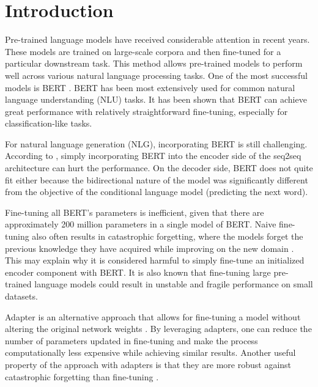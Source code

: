\chapter*{Introduction}
Pre-trained language models  have received considerable attention in recent years. These models are trained on large-scale corpora and then fine-tuned for a particular downstream task. This method allows pre-trained models to perform well across various natural language processing tasks. One of the most successful models is BERT . BERT has been most extensively used for common natural language understanding (NLU) tasks. It has been shown that BERT can achieve great performance with relatively straightforward fine-tuning, especially for classification-like tasks.

For natural language generation (NLG), incorporating BERT is still challenging. According to , simply incorporating BERT into the encoder side of the seq2seq architecture can hurt the performance. On the decoder side, BERT does not quite fit either because the bidirectional nature of the model was significantly different from the objective of the conditional language model (predicting the next word).

Fine-tuning all BERT's parameters is inefficient, given that there are approximately 200 million parameters in a single model of BERT. Naive fine-tuning also often results in catastrophic forgetting, where the models forget the previous knowledge they have acquired while improving on the new domain . This may explain why it is considered harmful to simply fine-tune an initialized encoder component with BERT. It is also known that fine-tuning large pre-trained language models could result in unstable and fragile performance on small datasets.

Adapter is an alternative approach that allows for fine-tuning a model without altering the original network weights . By leveraging adapters, one can reduce the number of parameters updated in fine-tuning and make the process computationally less expensive while achieving similar results. Another useful property of the approach with adapters is that they are more robust against catastrophic forgetting than fine-tuning .

